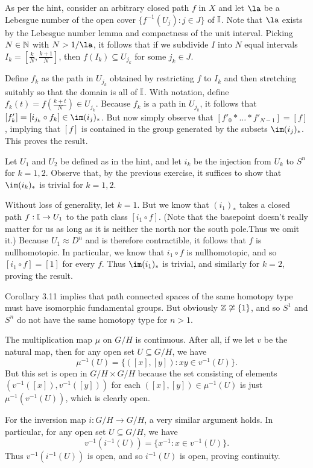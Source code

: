 \documentclass[../../solutions.tex]{subfiles}
\begin{document}
\begin{exercise} \leavevmode
As per the hint, consider an arbitrary closed path $f$ in $X$ and let $\la$ be a Lebesgue number of the open cover $\{f^{-1}(U_j):j\in J\}$ of $\mathbb I$. 
Note that $\la$ exists by the Lebesgue number lemma and compactness of the unit interval. 
Picking $N\in\mathbb{N}$ with $N>1/\la$, it follows that if we subdivide $I$ into $N$ equal intervals $I_k=[\frac kN,\frac{k+1}N]$, then $f(I_k)\subseteq U_{j_k}$ for some $j_k\in J$. 

Define $f_k$ as the path in $U_{j_k}$ obtained by restricting $f$ to $I_k$ and then stretching suitably so that the domain is all of $\mathbb I$.
With notation, define $f_k(t)=f\left(\frac{k+t}N\right)\in U_{j_k}$.
Because $f_k$ is a path in $U_{j_k}$, it follows that $[f'_k]=[i_{j_k}\circ f_k]\in\im(i_j)_*$. But now simply observe that $[f'_0*\dots*f'_{N-1}]=[f]$, implying that $[f]$ is contained in the group generated by the subsets $\im(i_j)_*$. This proves the result. 
\end{exercise}

\begin{exercise} \leavevmode
Let $U_1$ and $U_2$ be defined as in the hint, and let $i_k$ be the injection from $U_k$ to $S^n$ for $k=1,2$. 
Observe that, by the previous exercise, it suffices to show that $\im(i_k)_*$ is trivial for $k=1,2$. 

Without loss of generality, let $k=1$. 
But we know that $(i_1)_*$ takes a closed path $f:\mathbb I\to U_1$ to the path class $[i_1\circ f]$. 
(Note that the basepoint doesn't really matter for us as long as it is neither the north nor the south pole.Thus we omit it.)
Because $U_1\approx D^n$ and is therefore contractible, it follows that $f$ is nullhomotopic. 
In particular, we know that $i_1\circ f$ is nullhomotopic, and so $[i_1\circ f]=[1]$ for every $f$. 
Thus $\im(i_1)_*$ is trivial, and similarly for $k=2$, proving the result. 
\end{exercise}

\begin{exercise} \leavevmode
Corollary 3.11 implies that path connected spaces of the same homotopy type must have isomorphic fundamental groups. 
But obviously $\mathbb{Z}\not\cong\{1\}$, and so $S^1$ and $S^n$ do not have the same homotopy type for $n>1$. 
\end{exercise}

\begin{exercise} \leavevmode
The multiplication map $\mu$ on $G/H$ is continuous. 
After all, if we let $v$ be the natural map, then for any open set $U\subseteq G/H$, we have \[\mu^{-1}(U)=\{([x],[y]):xy\in v^{-1}(U)\}.\] 
But this set is open in $G/H\times G/H$ because the set consisting of elements $(v^{-1}([x]),v^{-1}([y]))$ for each $([x],[y])\in \mu^{-1}(U)$ is just $\mu^{-1}(v^{-1}(U))$, which is clearly open. 

For the inversion map $i:G/H\to G/H$, a very similar argument holds. 
In particular, for any open set $U\subseteq G/H$, we have \[v^{-1}(i^{-1}(U))=\{x^{-1}:x\in v^{-1}(U)\}.\]
Thus $v^{-1}(i^{-1}(U))$ is open, and so $i^{-1}(U)$ is open, proving continuity. 
\end{exercise}
\end{document}
